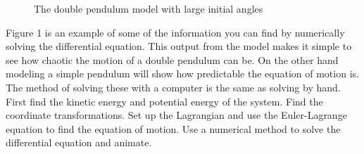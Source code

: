 \documentclass[runningheads]{llncs}
\begin{document}
\begin{figure}[h!]
    \centering
    \qquad
    \caption{The double pendulum model with large initial angles}%
    \label{fig:example}%
\end{figure}

Figure 1 is an example of some of the information you can find by numerically solving the differential equation. This output from the model makes it simple to see how chaotic the motion of a double pendulum can be. On the other hand modeling a simple pendulum will show how predictable the equation of motion is. \\

The method of solving these with a computer is the same as solving by hand. First find the kinetic energy and potential energy of the system. Find the coordinate transformations. Set up the Lagrangian and use the Euler-Lagrange equation to find the equation of motion. Use a numerical method to solve the differential equation and animate.
\end{document}
